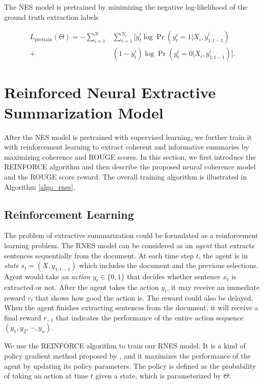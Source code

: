 	The NES model is pretrained by minimizing the negative log-likelihood of the ground truth extraction labels

\begin{align*}
	L_{\text{pretrain}}(\Theta) = - \sum_{i=1}^{N} &\sum_{t=1}^{N_i} \big[ \mathring{y}_t^i \log \Pr(y_t^i=1|X_i, \mathring{y}_{1:t-1}^i)\\ 
	 + & (1 - \mathring{y}_t^i) \log \Pr(y_t^i=0|X_i, \mathring{y}_{1:t-1}^i)\big] .
	\end{align*}

	\section{Reinforced Neural Extractive Summarization Model}
	\label{sec:rl}
    After the NES model is pretrained with supervised learning, we further train it with reinforcement learning to extract coherent and informative summaries by maximizing coherence and ROUGE scores. In this section, we first introduce the REINFORCE algorithm and then describe the proposed neural coherence model and the ROUGE score reward. The overall training algorithm is illustrated in Algorithm \ref{algo_rnes}.

	\subsection{Reinforcement Learning} 

	The problem of extractive summarization could be formulated as a reinforcement learning problem. The RNES model can be considered as an \emph{agent} that extracts sentences sequentially from the document. At each time step $t$, the agent is in \emph{state} $s_t = (X, y_{1:t-1})$ which includes the document and the previous selections. Agent would take an \emph{action} $y_t \in \{0,1\}$ that decides whether sentence $x_t$ is extracted or not. After the agent takes the action $y_t$, it may receive an immediate reward $r_{t}$ that shows how good the action is. The reward could also be delayed. When the agent finishes extracting sentences from the document, it will receive a final reward $r_{-1}$ that indicates the performance of the entire action sequence $(y_1, y_2, \cdots, y_n)$.

	We use the REINFORCE algorithm to train our RNES model. It is a kind of policy gradient method proposed by  \cite{williams_simple_1992}, and it maximizes the performance of the agent by updating its policy parameters. The policy is defined as the probability of taking an action at time $t$ given a state, which is parameterized by $\Theta$:

